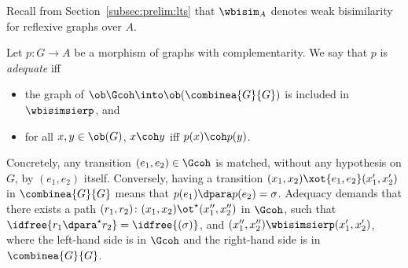 \documentclass{LMCS}
\theoremstyle{plain}\newtheorem{satz}[thm]{Satz}
\begin{document}
Recall from Section~\ref{subsec:prelim:lts} that $\wbisim_A$ denotes
weak bisimilarity for reflexive graphs over $A$.
\begin{defi}
  Let $p \colon G \to A$ be a morphism of graphs with
  complementarity. We say that $p$ is \emph{adequate} iff
  \begin{itemize}
  \item the graph of $\ob \Gcoh \into \ob(\combinea{G}{G})$ is
    included in $\wbisimsierp$, and
  \item for all $x,y \in \ob(G)$, $x \coh y$ iff $p(x) \coh p(y)$.
  \end{itemize}

\end{defi}
Concretely, any transition $(e_1,e_2) \in \Gcoh$ is matched, without
any hypothesis on $G$, by $(e_1,e_2)$ itself. Conversely, having a
transition $(x_1,x_2) \xot{e_1,e_2} (x'_1,x'_2)$ in $\combinea{G}{G}$
means that $p(e_1) \dpara p(e_2) = \sigma$. Adequacy demands that
there exists a path $(r_1,r_2) \colon (x_1,x_2) \ot^\star
(x''_1,x''_2)$ in $\Gcoh$, such that $\idfree{r_1 \dpara^\star
  r_2} = \idfree{(\sigma)}$, and $(x''_1,x''_2) \wbisimsierp
(x'_1,x'_2)$, where the left-hand side is in $\Gcoh$ and the
right-hand side is in $\combinea{G}{G}$.
\end{document}
